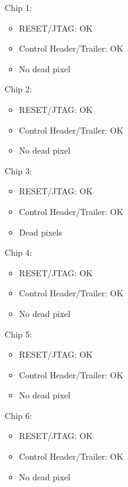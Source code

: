 \documentclass[a4papper, 10pt]{article}
\begin{document}
     \begin{itemize}
       \item[Chip 1:]
         \begin{itemize}
            \item RESET/JTAG: OK
            \item Control Header/Trailer: OK
            \item No dead pixel
         \end{itemize}  
       \item[Chip 2:]
         \begin{itemize}
            \item RESET/JTAG: OK
            \item Control Header/Trailer: OK
            \item No dead pixel
         \end{itemize}  
       \item[Chip 3:]
         \begin{itemize}
            \item RESET/JTAG: OK
            \item Control Header/Trailer: OK
            \item Dead pixels
         \end{itemize}  
       \item[Chip 4:]
         \begin{itemize}
            \item RESET/JTAG: OK
            \item Control Header/Trailer: OK
            \item No dead pixel
         \end{itemize}  
       \item[Chip 5:]
         \begin{itemize}
            \item RESET/JTAG: OK
            \item Control Header/Trailer: OK
            \item No dead pixel
         \end{itemize}  
       \item[Chip 6:]
         \begin{itemize}
            \item RESET/JTAG: OK
            \item Control Header/Trailer: OK
            \item No dead pixel
         \end{itemize}  
     \end{itemize}
\end{document}

